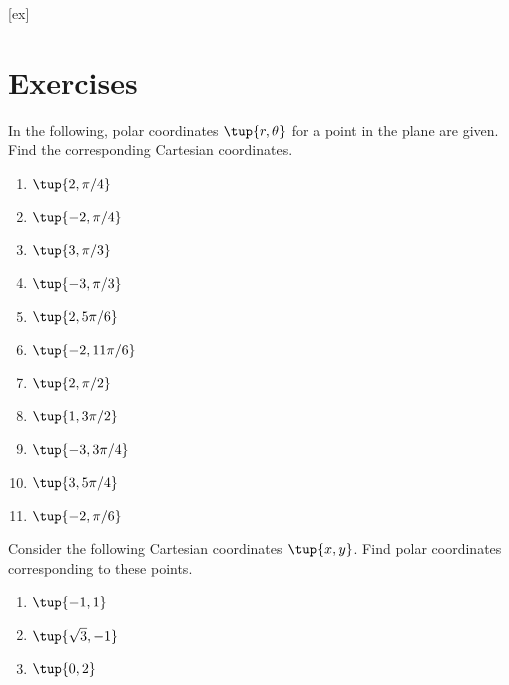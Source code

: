 [ex]
\section*{Exercises}

\begin{enumialphparenastyle}

\begin{ex} In the following, polar coordinates $\tup{r,\theta } $ for a
point in the plane are given. Find the corresponding Cartesian coordinates. 

\begin{enumerate}
\item $\tup{2,\pi /4} $

\item $\tup{-2,\pi /4} $

\item $\tup{3,\pi /3} $

\item $\tup{-3,\pi /3} $

\item $\tup{2,5\pi /6} $

\item $\tup{-2,11\pi /6} $

\item $\tup{2,\pi /2} $

\item $\tup{1,3\pi /2} $

\item $\tup{-3,3\pi /4} $

\item $\tup{3,5\pi /4} $

\item $\tup{-2,\pi /6} $
\end{enumerate}
\end{ex}

\begin{ex} Consider the following Cartesian coordinates $\tup{x,y}$. Find polar coordinates corresponding to these points. 

\begin{enumerate}
\item $\tup{-1,1} $

\item $\tup{\sqrt{3},-1} $

\item $\tup{0,2} $


\end{enumerate}
\end{ex}
\end{enumialphparenastyle}
